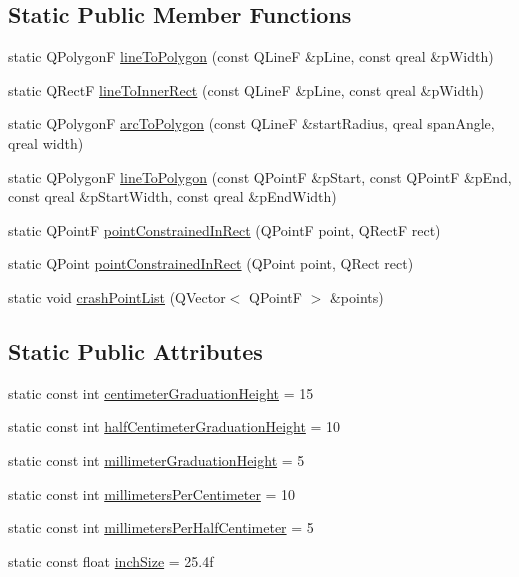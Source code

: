 \subsection*{Static Public Member Functions}
\begin{DoxyCompactItemize}
\item 
static Q\-Polygon\-F \hyperlink{class_u_b_geometry_utils_a379c882cb437d18ebf536bdc1f40d12f}{line\-To\-Polygon} (const Q\-Line\-F \&p\-Line, const qreal \&p\-Width)
\item 
static Q\-Rect\-F \hyperlink{class_u_b_geometry_utils_a8d1e50c5d7d52bcf01179511b4231356}{line\-To\-Inner\-Rect} (const Q\-Line\-F \&p\-Line, const qreal \&p\-Width)
\item 
static Q\-Polygon\-F \hyperlink{class_u_b_geometry_utils_a12ba7130be2103b70f39138073d3d4ec}{arc\-To\-Polygon} (const Q\-Line\-F \&start\-Radius, qreal span\-Angle, qreal width)
\item 
static Q\-Polygon\-F \hyperlink{class_u_b_geometry_utils_afdba873a14962f8c8e5746d8c8b74b53}{line\-To\-Polygon} (const Q\-Point\-F \&p\-Start, const Q\-Point\-F \&p\-End, const qreal \&p\-Start\-Width, const qreal \&p\-End\-Width)
\item 
static Q\-Point\-F \hyperlink{class_u_b_geometry_utils_a488ce1d8bccec0310e6cb7a359aef854}{point\-Constrained\-In\-Rect} (Q\-Point\-F point, Q\-Rect\-F rect)
\item 
static Q\-Point \hyperlink{class_u_b_geometry_utils_aa03a6f34b91aa807404db6eaf8c8e9eb}{point\-Constrained\-In\-Rect} (Q\-Point point, Q\-Rect rect)
\item 
static void \hyperlink{class_u_b_geometry_utils_a84c18013880b48ced22fd7bf1c91aa2a}{crash\-Point\-List} (Q\-Vector$<$ Q\-Point\-F $>$ \&points)
\end{DoxyCompactItemize}
\subsection*{Static Public Attributes}
\begin{DoxyCompactItemize}
\item 
static const int \hyperlink{class_u_b_geometry_utils_a57c5feb3a3234d02f24fb5a4c10fcc06}{centimeter\-Graduation\-Height} = 15
\item 
static const int \hyperlink{class_u_b_geometry_utils_a619b34e990f58aecca2a3f029fade400}{half\-Centimeter\-Graduation\-Height} = 10
\item 
static const int \hyperlink{class_u_b_geometry_utils_a73d6393ad58bf658d1dfc10cebb61921}{millimeter\-Graduation\-Height} = 5
\item 
static const int \hyperlink{class_u_b_geometry_utils_a88024bb127e395f7eafc59df9bc39f63}{millimeters\-Per\-Centimeter} = 10
\item 
static const int \hyperlink{class_u_b_geometry_utils_a5169b28d2a1b47f292dbc6d79a1dc8ef}{millimeters\-Per\-Half\-Centimeter} = 5
\item 
static const float \hyperlink{class_u_b_geometry_utils_a1f5d4e8f0ad9766ef4325e41562b5d33}{inch\-Size} = 25.\-4f
\end{DoxyCompactItemize}


